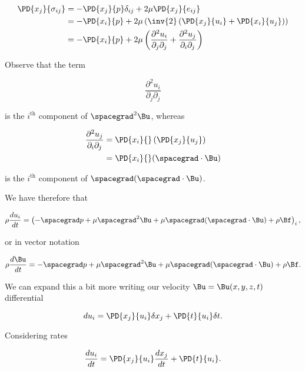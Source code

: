 \begin{align*}
\PD{x_j}{\sigma_{ij}} 
&= - \PD{x_j}{p} \delta_{ij} + 2 \mu \PD{x_j}{e_{ij}} \\
&= - \PD{x_i}{p} + 2 \mu \left( 
\inv{2} \left(
 \PD{x_j}{u_i}
+ \PD{x_i}{u_j}
\right)
\right) \\
&= - \PD{x_i}{p} + 2 \mu \left(
\frac{\partial^2 u_i}{\partial_j \partial_j}
+\frac{\partial^2 u_j}{\partial_i \partial_j}
\right) 
\end{align*}

Observe that the term

\begin{equation}\label{eqn:continuumL10:190}
\frac{\partial^2 u_i}{\partial_j \partial_j}
\end{equation}

is the $i^{\text{th}}$ component of $\spacegrad^2 \Bu$, whereas

\begin{align*}
\frac{\partial^2 u_j}{\partial_i \partial_j} 
&= \PD{x_i}{} \left( \PD{x_j}{u_j} \right) \\
&= \PD{x_i}{} (\spacegrad \cdot \Bu)
\end{align*}

is the $i^{\text{th}}$ component of $\spacegrad (\spacegrad \cdot \Bu)$.

We have therefore that 

\begin{equation}\label{eqn:continuumL10:210}
\rho \frac{du_i}{dt} = \left( -\spacegrad p + \mu \spacegrad^2 \Bu 
+ \mu \spacegrad (\spacegrad \cdot \Bu) + \rho \Bf
\right)_i,
\end{equation}

or in vector notation

\begin{equation}\label{eqn:continuumL10:230}
\rho \frac{d\Bu}{dt} = -\spacegrad p + \mu \spacegrad^2 \Bu 
+ \mu \spacegrad (\spacegrad \cdot \Bu) + \rho \Bf.
\end{equation}

We can expand this a bit more writing our velocity $\Bu = \Bu(x, y, z, t)$ differential 

\begin{equation}\label{eqn:continuumL10:250}
du_i = \PD{x_j}{u_i} \delta x_j + \PD{t}{u_i} \delta t.
\end{equation}

Considering rates

\begin{equation}\label{eqn:continuumL10:270}
\frac{du_i}{dt} = \PD{x_j}{u_i} \frac{dx_j}{dt} + \PD{t}{u_i} .
\end{equation}

